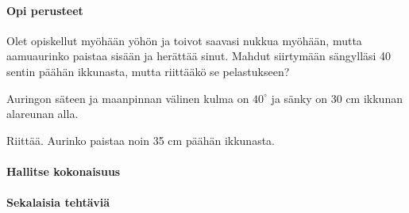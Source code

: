\begin{tehtavasivu}
\paragraph*{Opi perusteet}

  \begin{tehtava}
    Olet opiskellut myöhään yöhön ja toivot saavasi nukkua myöhään, mutta aamuaurinko paistaa sisään ja herättää sinut. Mahdut siirtymään sängylläsi 40 sentin päähän ikkunasta, mutta riittääkö se pelastukseen?
    
    Auringon säteen ja maanpinnan välinen kulma on $40^\circ$ ja sänky on 30 cm ikkunan alareunan alla.
    \begin{vastaus}
    Riittää. Aurinko paistaa noin 35 cm päähän ikkunasta.
    \end{vastaus}
  \end{tehtava}

\paragraph*{Hallitse kokonaisuus}

\paragraph*{Sekalaisia tehtäviä}
\end{tehtavasivu}

